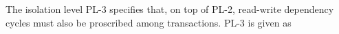 \documentclass{sig-alternate-05-2015}
\begin{document}
 The isolation level  PL-3 specifies that, on top of PL-2,  read-write dependency cycles \cite{DBLP:conf/icde/AdyaLO00}
  must also be proscribed among transactions. PL-3 is given as
  \begin{align}\label{eqn:PL3}
\begin{split}

\end{split}
\end{align}
\end{document}
